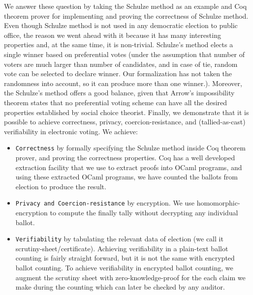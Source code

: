 \noindent
We answer these question by taking the Schulze method \citep{Schulze:2011:NMC} 
as an example and Coq \citep{Bertot:2004:ITP}
theorem prover  for implementing and proving the correctness of  Schulze method.
Even though Schulze method is not used in any democratic election to public office, the reason 
 we went ahead with it because it has many interesting properties and, 
 at the same time, it is non-trivial.   Schulze's method elects  a single winner based on 
preferential votes (under the assumption that number of voters are much larger than number of candidates, 
and in case of tie, random vote can be selected to declare winner.  Our formalization 
has not taken the randomness into account, so it can produce more than one winner.).
Moreover, the Schulze's method offers a good balance, given that 
Arrow's impossibility theorem \citep{Arrow:1950:DCS} states
 that no preferential voting 
scheme can have all the desired properties established by  social choice theorist.
Finally, we demonstrate that it is possible to achieve correctness, privacy, coercion-resistance, and (tallied-as-cast) verifiability in 
electronic voting. We achieve:
\begin{itemize}
 \item \texttt{Correctness} by formally specifying the Schulze method  inside 
 Coq theorem prover, and proving the correctness properties. 
 Coq has a well developed extraction facility that 
 we use to extract proofs into OCaml programs, and using these extracted OCaml programs, we 
 have counted the ballots from election to produce the result. 
 \item \texttt{Privacy and Coercion-resistance} by encryption. We use homomorphic-encryption to compute the 
  finally tally without decrypting any individual ballot. 
\item \texttt{Verifiability} by tabulating the relevant data of election (we call it scrutiny-sheet/certificate).
   Achieving verifiability in a plain-text ballot counting is fairly straight forward, but it is not 
   the same with encrypted ballot counting.  To achieve verifiability in encrypted ballot counting, 
   we augment the scrutiny sheet with zero-knowledge-proof for the each claim we make during the 
   counting which can  later be checked by any auditor.  
\end{itemize}





